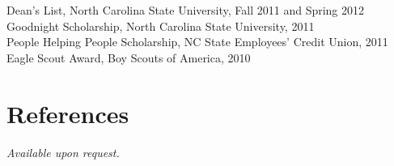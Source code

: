 \documentclass[margin,line,letterpaper]{resume}
\begin{document}
\begin{resume}
    Dean's List, North Carolina State University, Fall 2011 and Spring 2012   \vspace{-8mm}\\%

    Goodnight Scholarship, North Carolina State University, 2011              \vspace{-8mm}\\%

    People Helping People Scholarship, NC State Employees' Credit Union, 2011 \vspace{-8mm}\\%

    Eagle Scout Award, Boy Scouts of America, 2010

    \section{\mysidestyle References}
    {\sl Available upon request.}




\end{resume}
\end{document}
